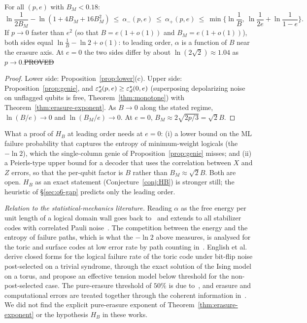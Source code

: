 \begin{proposition}\label{prop:hb-status}
For all $(p,e)$ with $B_M<0.18$:
\[
\ln\frac1{2B_M}-\ln(1+4B_M+16B_M^2)\ \le\ \alpha_-(p,e)\ \le\ \alpha_+(p,e)\ \le\ \min\Big\{\ln\frac1B,\ \ln\frac1{2e}+\ln\frac1{1-e}\Big\}.
\]
If $p\to0$ faster than $e^2$ (so that $B=e(1+o(1))$ and $B_M=e(1+o(1))$), both sides equal $\ln\frac1B-\ln2+o(1)$: to leading order, $\alpha$ is a function of $B$ near the erasure axis. At $e=0$ the two sides differ by about $\ln(2\sqrt2)\approx1.04$ as $p\to0$.\hfill\st{PROVED}
\end{proposition}
\begin{proof}
Lower side: Proposition~\ref{prop:lower}(c). Upper side: Proposition~\ref{prop:genie}, and $\varepsilon^{\star}_d(p,e)\ge\varepsilon^{\star}_d(0,e)$ (superposing depolarizing noise on unflagged qubits is free, Theorem~\ref{thm:monotone}) with Theorem~\ref{thm:erasure-exponent}. As $B\to0$ along the stated regime, $\ln(B/e)\to0$ and $\ln(B_M/e)\to0$. At $e=0$, $B_M\approx2\sqrt{2p/3}=\sqrt2B$.
\end{proof}

\noindent What a proof of $H_B$ at leading order needs at $e=0$: (i) a lower bound on the ML failure probability that captures the entropy of minimum-weight logicals (the $-\ln2$), which the single-column genie of Proposition~\ref{prop:genie} misses; and (ii) a Peierls-type upper bound for a decoder that uses the correlation between $X$ and $Z$ errors, so that the per-qubit factor is $B$ rather than $B_M\approx\sqrt2B$. Both are open. $H_B$ as an exact statement (Conjecture~\ref{conj:HB}) is stronger still; the heuristic of \S\ref{sec:o6-gap} predicts only the leading order.

\noindent\emph{Relation to the statistical-mechanics literature.} Reading $\alpha$ as the free energy per unit length of a logical domain wall goes back to~\cite{DKLP} and extends to all stabilizer codes with correlated Pauli noise~\cite{CF}. The competition between the energy and the entropy of failure paths, which is what the $-\ln2$ above measures, is analysed for the toric and surface codes at low error rate by path counting in~\cite{WatsonBarrett,BBKM}. English et al.~\cite{English} derive closed forms for the logical failure rate of the toric code under bit-flip noise post-selected on a trivial syndrome, through the exact solution of the Ising model on a torus, and propose an effective tension model below threshold for the non-post-selected case. The pure-erasure threshold of $50\%$ is due to~\cite{SBD}, and erasure and computational errors are treated together through the coherent information in~\cite{Colmenarez}. We did not find the explicit pure-erasure exponent of Theorem~\ref{thm:erasure-exponent} or the hypothesis $H_B$ in these works.
